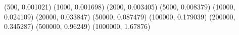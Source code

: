 (500, 0.001021) (1000, 0.001698) (2000, 0.003405) (5000, 0.008379) (10000, 0.024109) (20000, 0.033847) (50000, 0.087479) (100000, 0.179039) (200000, 0.345287) (500000, 0.96249) (1000000, 1.67876) 
